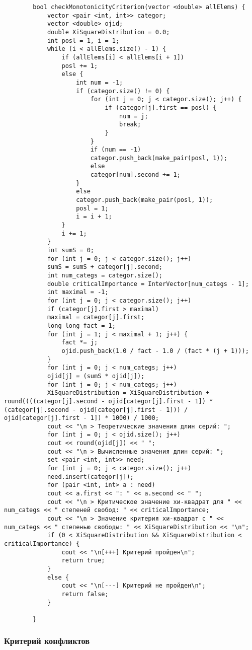 \documentclass[bachelor, och, coursework]{shiza}
\begin{document}
	\begin{verbatim}
		bool checkMonotonicityCriterion(vector <double> allElems) {
			vector <pair <int, int>> categor;
			vector <double> ojid;
			double XiSquareDistribution = 0.0;
			int posl = 1, i = 1;
			while (i < allElems.size() - 1) {
				if (allElems[i] < allElems[i + 1])
				posl += 1;
				else {
					int num = -1;
					if (categor.size() != 0) {
						for (int j = 0; j < categor.size(); j++) {
							if (categor[j].first == posl) {
								num = j;
								break;
							}
						}
						if (num == -1)
						categor.push_back(make_pair(posl, 1));
						else
						categor[num].second += 1;
					}
					else
					categor.push_back(make_pair(posl, 1));
					posl = 1;
					i = i + 1;
				}
				i += 1;
			}
			int sumS = 0;
			for (int j = 0; j < categor.size(); j++)
			sumS = sumS + categor[j].second;
			int num_categs = categor.size();
			double criticalImportance = InterVector[num_categs - 1];
			int maximal = -1;
			for (int j = 0; j < categor.size(); j++)
			if (categor[j].first > maximal)
			maximal = categor[j].first;
			long long fact = 1;
			for (int j = 1; j < maximal + 1; j++) {
				fact *= j;
				ojid.push_back(1.0 / fact - 1.0 / (fact * (j + 1)));
			}
			for (int j = 0; j < num_categs; j++)
			ojid[j] = (sumS * ojid[j]);
			for (int j = 0; j < num_categs; j++)
			XiSquareDistribution = XiSquareDistribution + round((((categor[j].second - ojid[categor[j].first - 1]) * (categor[j].second - ojid[categor[j].first - 1])) / ojid[categor[j].first - 1]) * 1000) / 1000;
			cout << "\n > Теоретические значения длин серий: ";
			for (int j = 0; j < ojid.size(); j++)
			cout << round(ojid[j]) << " ";
			cout << "\n > Вычисленные значения длин серий: ";
			set <pair <int, int>> need;
			for (int j = 0; j < categor.size(); j++)
			need.insert(categor[j]);
			for (pair <int, int> a : need)
			cout << a.first << ": " << a.second << " ";
			cout << "\n > Критическое значение хи-квадрат для " << num_categs << " степеней свобод: " << criticalImportance;
			cout << "\n > Значение критерия хи-квадрат с " << num_categs << " степенью свободы: " << XiSquareDistribution << "\n";
			if (0 < XiSquareDistribution && XiSquareDistribution < criticalImportance) {
				cout << "\n[+++] Критерий пройден\n";
				return true;
			}
			else {
				cout << "\n[---] Критерий не пройден\n";
				return false;
			}
			
		}
	\end{verbatim}
		
	\subsubsection{Критерий конфликтов}
	
\end{document}
